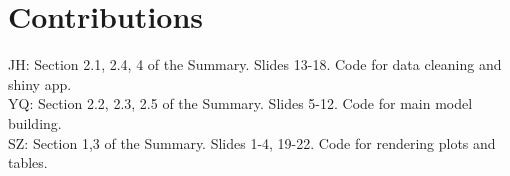 \documentclass[12pt]{article}
\begin{document}
	\pagebreak
	\section*{Contributions}
	
	\noindent JH: Section 2.1, 2.4, 4 of the Summary. Slides 13-18. Code for data cleaning and shiny app. \\
	YQ: Section 2.2, 2.3, 2.5 of the Summary. Slides 5-12. Code for main model building.\\
	SZ: Section 1,3 of the Summary. Slides 1-4, 19-22. Code for rendering plots and tables.\\
	
	
	
	
	
	
	
\end{document}
